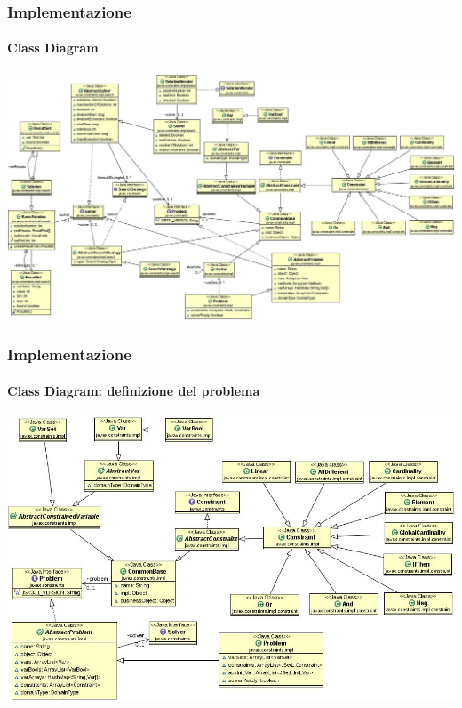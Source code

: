 \documentclass{beamer}
\begin{document}
\begin{frame}
\frametitle{Implementazione}
\framesubtitle{Class Diagram}
\begin{center}
\includegraphics[scale=0.22]{../relazione/img/Progetto.JPG}
\end{center}
\end{frame}

\begin{frame}
\frametitle{Implementazione}
\framesubtitle{Class Diagram: definizione del problema}
\begin{center}
\includegraphics[scale=0.32]{../relazione/img/Problema.JPG}
\end{center}
\end{frame}
\end{document}
